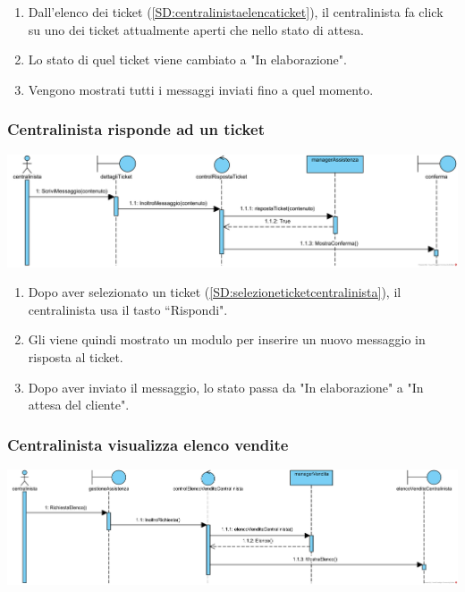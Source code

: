 \documentclass[12pt]{article}
\begin{document}
\begin{enumerate}
\item Dall'elenco dei ticket (\ref{SD:centralinistaelencaticket}), il centralinista fa click su uno dei ticket attualmente aperti che nello stato di attesa.
\item Lo stato di quel ticket viene cambiato a "In elaborazione".
\item Vengono mostrati tutti i messaggi inviati fino a quel momento.
\end{enumerate}

\newpage

\subsubsection{Centralinista risponde ad un ticket}
\label{SD:rispostaticketcentralinista}

\begin{center}
\includegraphics[width=\textwidth]{SequenceDiagram/CentralinistaTicketRisponde}
\end{center}

\begin{enumerate}
\item Dopo aver selezionato un ticket (\ref{SD:selezioneticketcentralinista}), il centralinista usa il tasto ``Rispondi".
\item Gli viene quindi mostrato un modulo per inserire un nuovo messaggio in risposta al ticket.
\item Dopo aver inviato il messaggio, lo stato passa da "In elaborazione" a "In attesa del cliente".
\end{enumerate}

\subsubsection{Centralinista visualizza elenco vendite}
\label{SD:elencovenditecentralinista}

\begin{center}
\includegraphics[width=\textwidth]{SequenceDiagram/CentralinistaVenditeElenco}
\end{center}
\end{document}
